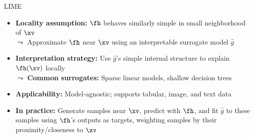 \documentclass[11pt,compress,t,notes=noshow, aspectratio=169, xcolor=table]{beamer}
\newcommand{\gh}{\hat{g}}
\begin{document}
\begin{frame}[t]{LIME}
  \begin{itemize}%
    \item \textbf{Locality assumption:} $\fh$ behaves similarly simple in small neighborhood of $\xv$\\
    $\leadsto$ Approximate $\fh$ near $\xv$ using an interpretable surrogate model $\gh$
    \item \textbf{Interpretation strategy:} Use $\gh$'s simple internal structure to explain $\fh(\xv)$ locally\\
    $\leadsto$ \textbf{Common surrogates:} Sparse linear models, shallow decision trees
    \item \textbf{Applicability:} Model‑agnostic; supports tabular, image, and text data %
    \item \textbf{In practice:} Generate samples near $\xv$, predict with $\fh$, and fit $\gh$ to these samples using $\fh$’s outputs as targets, weighting samples by their proximity/closeness to $\xv$

  \end{itemize}
\end{frame}


\end{document}
